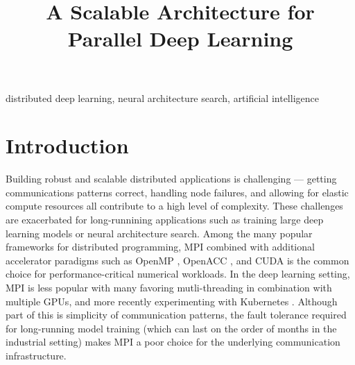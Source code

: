 \documentclass[conference]{IEEEtran}
\begin{document}
\title{A Scalable Architecture for Parallel Deep Learning}

\author{
\and
{}
}

\maketitle

\begin{abstract}

\end{abstract}

\begin{IEEEkeywords}
distributed deep learning, neural architecture search, artificial intelligence
\end{IEEEkeywords}

\section{Introduction}
Building robust and scalable distributed applications is challenging --- getting
communications patterns correct, handling node failures, and allowing for elastic
compute resources all contribute to a high level of complexity. These challenges
are exacerbated for long-runnining applications such as training large deep learning
models or neural architecture search. Among the many popular frameworks for
distributed programming, MPI \cite{Forum:1994:MMI:898758} combined with
additional accelerator paradigms such as OpenMP \cite{Dagum:1998:OIA:615255.615542},
OpenACC \cite{Wienke:2012:OFE:2402420.2402522}, and CUDA \cite{Nickolls:2008:SPP:1365490.1365500}
is the common choice for performance-critical numerical workloads. In the deep
learning setting, MPI is less popular with many favoring mutli-threading in
combination with multiple GPUs, and more recently experimenting with Kubernetes
\cite{8094194, 8672301}. Although part of this is simplicity of communication patterns,
the fault tolerance required for long-running model training (which can last on the
order of months in the industrial setting) makes MPI a poor choice for the underlying
communication infrastructure.
\end{document}
